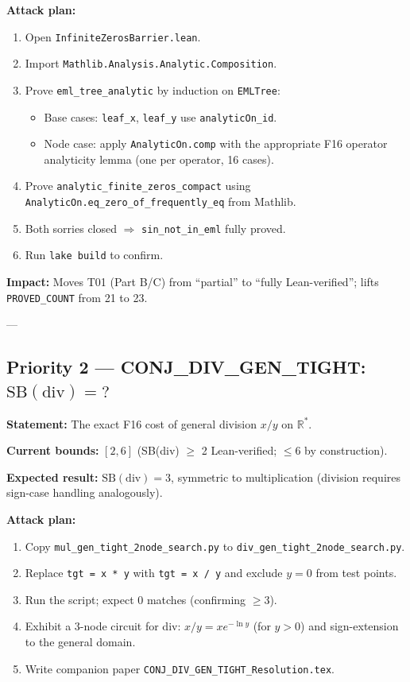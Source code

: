 \documentclass[12pt]{article}
\theoremstyle{definition}
\begin{document}
\textbf{Attack plan:}
\begin{enumerate}
  \item Open \texttt{InfiniteZerosBarrier.lean}.
  \item Import \texttt{Mathlib.Analysis.Analytic.Composition}.
  \item Prove \texttt{eml\_tree\_analytic} by induction on \texttt{EMLTree}:
    \begin{itemize}
      \item Base cases: \texttt{leaf\_x}, \texttt{leaf\_y} use \texttt{analyticOn\_id}.
      \item Node case: apply \texttt{AnalyticOn.comp} with the appropriate
        F16 operator analyticity lemma (one per operator, 16 cases).
    \end{itemize}
  \item Prove \texttt{analytic\_finite\_zeros\_compact} using
    \texttt{AnalyticOn.eq\_zero\_of\_frequently\_eq} from Mathlib.
  \item Both sorries closed $\Rightarrow$ \texttt{sin\_not\_in\_eml} fully proved.
  \item Run \texttt{lake build} to confirm.
\end{enumerate}

\textbf{Impact:} Moves T01 (Part B/C) from ``partial'' to ``fully Lean-verified'';
lifts \texttt{PROVED\_COUNT} from 21 to 23.

---

\subsection{Priority 2 — CONJ\_DIV\_GEN\_TIGHT: $\mathrm{SB}(\mathrm{div}) = ?$}

\textbf{Statement:} The exact F16 cost of general division $x/y$ on $\mathbb{R}^*$.

\textbf{Current bounds:} $[2, 6]$ (SB(div) $\geq$ 2 Lean-verified; $\leq 6$ by
construction).

\textbf{Expected result:} $\mathrm{SB}(\mathrm{div}) = 3$, symmetric to multiplication
(division requires sign-case handling analogously).

\textbf{Attack plan:}
\begin{enumerate}
  \item Copy \texttt{mul\_gen\_tight\_2node\_search.py} to
    \texttt{div\_gen\_tight\_2node\_search.py}.
  \item Replace \texttt{tgt = x * y} with \texttt{tgt = x / y} and exclude
    $y = 0$ from test points.
  \item Run the script; expect 0 matches (confirming $\geq 3$).
  \item Exhibit a 3-node circuit for div: $x/y = xe^{-\ln y}$ (for $y > 0$)
    and sign-extension to the general domain.
  \item Write companion paper \texttt{CONJ\_DIV\_GEN\_TIGHT\_Resolution.tex}.
\end{enumerate}
\end{document}
